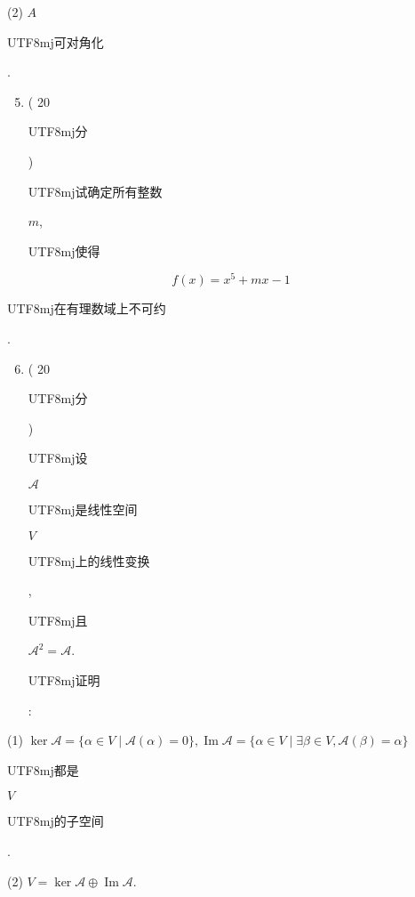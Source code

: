\documentclass[10pt]{article}
\begin{document}
(2) $A$ \begin{CJK}{UTF8}{mj}可对角化\end{CJK}.

\begin{enumerate}
  \setcounter{enumi}{4}
  \item ( 20 \begin{CJK}{UTF8}{mj}分\end{CJK}) \begin{CJK}{UTF8}{mj}试确定所有整数\end{CJK} $m$, \begin{CJK}{UTF8}{mj}使得\end{CJK}
\end{enumerate}
$$
f(x)=x^{5}+m x-1
$$
\begin{CJK}{UTF8}{mj}在有理数域上不可约\end{CJK}.

\begin{enumerate}
  \setcounter{enumi}{5}
  \item ( 20 \begin{CJK}{UTF8}{mj}分\end{CJK}) \begin{CJK}{UTF8}{mj}设\end{CJK} $\mathscr{A}$ \begin{CJK}{UTF8}{mj}是线性空间\end{CJK} $V$ \begin{CJK}{UTF8}{mj}上的线性变换\end{CJK}, \begin{CJK}{UTF8}{mj}且\end{CJK} $\mathscr{A}^{2}=\mathscr{A}$. \begin{CJK}{UTF8}{mj}证明\end{CJK}:
\end{enumerate}
(1) $\operatorname{ker} \mathscr{A}=\{\alpha \in V \mid \mathscr{A}(\alpha)=0\}, \operatorname{Im} \mathscr{A}=\{\alpha \in V \mid \exists \beta \in V, \mathscr{A}(\beta)=\alpha\}$ \begin{CJK}{UTF8}{mj}都是\end{CJK} $V$ \begin{CJK}{UTF8}{mj}的子空间\end{CJK}.

(2) $V=\operatorname{ker} \mathscr{A} \oplus \operatorname{Im} \mathscr{A}$.
\end{document}
